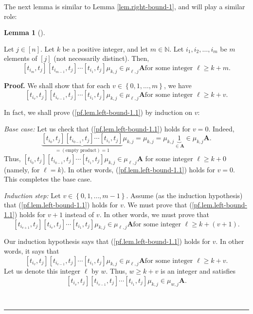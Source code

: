 \documentclass[numbers=enddot,12pt,final,onecolumn,notitlepage]{scrartcl}%
\theoremstyle{definition}
\newtheorem{lem}[theo]{Lemma}
\newenvironment{lemma}[1][]
{\begin{lem}[#1]\begin{leftbar}}
{\end{leftbar}\end{lem}}
\newenvironment{proof}[1][Proof]{\noindent\textbf{#1.} }{\ \rule{0.5em}{0.5em}}
\begin{document}
The next lemma is similar to Lemma \ref{lem.right-bound-1}, and will play a
similar role:

\begin{lemma}
\label{lem.left-bound-1}Let $j\in\left[  n\right]  $. Let $k$ be a positive
integer, and let $m\in\mathbb{N}$. Let $i_{1},i_{2},\ldots,i_{m}$ be $m$
elements of $\left[  j\right]  $ (not necessarily distinct). Then,%
\[
\left[  t_{i_{m}},t_{j}\right]  \left[  t_{i_{m-1}},t_{j}\right]
\cdots\left[  t_{i_{1}},t_{j}\right]  \mu_{k,j}\in\mu_{\ell,j}\mathbf{A}\text{
for some integer }\ell\geq k+m.
\]

\end{lemma}

\begin{proof}
We shall show that for each $v\in\left\{  0,1,\ldots,m\right\}  $, we have
\begin{equation}
\left[  t_{i_{v}},t_{j}\right]  \left[  t_{i_{v-1}},t_{j}\right]
\cdots\left[  t_{i_{1}},t_{j}\right]  \mu_{k,j}\in\mu_{\ell,j}\mathbf{A}\text{
for some integer }\ell\geq k+v. \label{pf.lem.left-bound-1.1}%
\end{equation}


In fact, we shall prove (\ref{pf.lem.left-bound-1.1}) by induction on $v$:

\textit{Base case:} Let us check that (\ref{pf.lem.left-bound-1.1}) holds for
$v=0$. Indeed,
\[
\underbrace{\left[  t_{i_{0}},t_{j}\right]  \left[  t_{i_{0-1}},t_{j}\right]
\cdots\left[  t_{i_{1}},t_{j}\right]  }_{=\left(  \text{empty product}\right)
=1}\mu_{k,j}=\mu_{k,j}=\mu_{k,j}\underbrace{1}_{\in\mathbf{A}}\in\mu
_{k,j}\mathbf{A}.
\]
Thus, $\left[  t_{i_{0}},t_{j}\right]  \left[  t_{i_{0-1}},t_{j}\right]
\cdots\left[  t_{i_{1}},t_{j}\right]  \mu_{k,j}\in\mu_{\ell,j}\mathbf{A}$ for
some integer $\ell\geq k+0$ (namely, for $\ell=k$). In other words,
(\ref{pf.lem.left-bound-1.1}) holds for $v=0$. This completes the base case.

\textit{Induction step:} Let $v\in\left\{  0,1,\ldots,m-1\right\}  $. Assume
(as the induction hypothesis) that (\ref{pf.lem.left-bound-1.1}) holds for
$v$. We must prove that (\ref{pf.lem.left-bound-1.1}) holds for $v+1$ instead
of $v$. In other words, we must prove that%
\[
\left[  t_{i_{v+1}},t_{j}\right]  \left[  t_{i_{v}},t_{j}\right]
\cdots\left[  t_{i_{1}},t_{j}\right]  \mu_{k,j}\in\mu_{\ell,j}\mathbf{A}\text{
for some integer }\ell\geq k+\left(  v+1\right)  .
\]


Our induction hypothesis says that (\ref{pf.lem.left-bound-1.1}) holds for
$v$. In other words, it says that%
\[
\left[  t_{i_{v}},t_{j}\right]  \left[  t_{i_{v-1}},t_{j}\right]
\cdots\left[  t_{i_{1}},t_{j}\right]  \mu_{k,j}\in\mu_{\ell,j}\mathbf{A}\text{
for some integer }\ell\geq k+v.
\]
Let us denote this integer $\ell$ by $w$. Thus, $w\geq k+v$ is an integer and
satisfies%
\begin{equation}
\left[  t_{i_{v}},t_{j}\right]  \left[  t_{i_{v-1}},t_{j}\right]
\cdots\left[  t_{i_{1}},t_{j}\right]  \mu_{k,j}\in\mu_{w,j}\mathbf{A}.
\label{pf.lem.left-bound-1.IS.3}%
\end{equation}



\end{proof}
\end{document}
